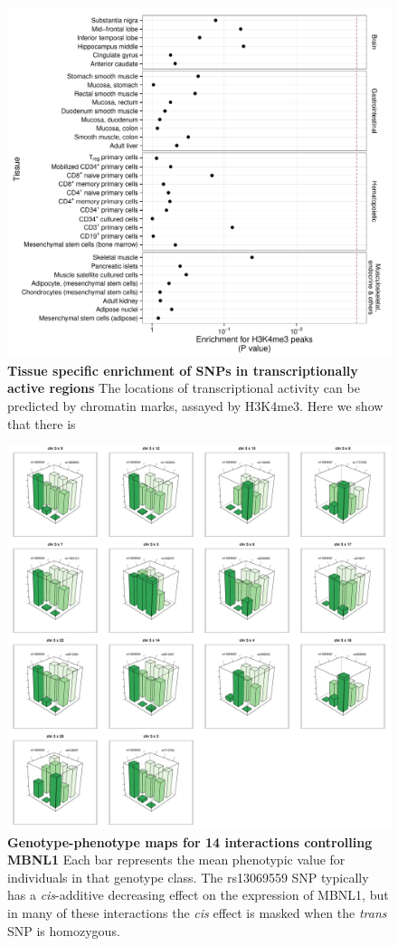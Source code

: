 \documentclass{article}
\begin{document}
\begin{figure}
	\includegraphics[width=5in]{trans_h3k4me3}
	\caption{\textbf{Tissue specific enrichment of SNPs in transcriptionally active regions} The locations of transcriptional activity can be predicted by chromatin marks, assayed by H3K4me3. Here we show that there is }
	\label{fig:transh3k4me3}
\end{figure}
\clearpage

\begin{figure}
	\includegraphics[width=5in]{MBNL1}
	\caption{\textbf{Genotype-phenotype maps for 14 interactions controlling MBNL1} Each bar represents the mean phenotypic value for individuals in that genotype class. The rs13069559 SNP typically has a \emph{cis}-additive decreasing effect on the expression of MBNL1, but in many of these interactions the \emph{cis} effect is masked when the \emph{trans} SNP is homozygous.}
	\label{fig:mbnl13d}
\end{figure}
\clearpage
\end{document}
